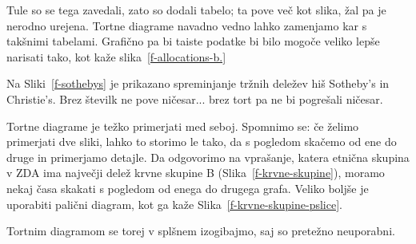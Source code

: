 Tule so se tega zavedali, zato so dodali tabelo; ta pove več kot slika, žal pa je nerodno urejena.
Tortne diagrame navadno vedno lahko zamenjamo kar s takšnimi tabelami. Grafično pa bi taiste podatke bi bilo mogoče veliko lepše narisati tako, kot kaže slika~\ref{f-allocations-b.}

Na Sliki~\ref{f-sothebys} je prikazano spreminjanje tržnih deležev hiš Sotheby's in Christie's. Brez številk ne pove ničesar... brez tort pa ne bi pogrešali ničesar.

Tortne diagrame je težko primerjati med seboj. Spomnimo se: če želimo primerjati dve sliki, lahko to storimo le tako, da s pogledom skačemo od ene do druge in primerjamo detajle. Da odgovorimo na vprašanje, katera etnična skupina v ZDA ima največji delež krvne skupine B (Slika~\ref{f-krvne-skupine}), moramo nekaj časa skakati s pogledom od enega do drugega grafa. Veliko boljše je uporabiti palični diagram, kot ga kaže Slika~\ref{f-krvne-skupine-pslice}.

Tortnim diagramom se torej v splšnem izogibajmo, saj so pretežno neuporabni.



